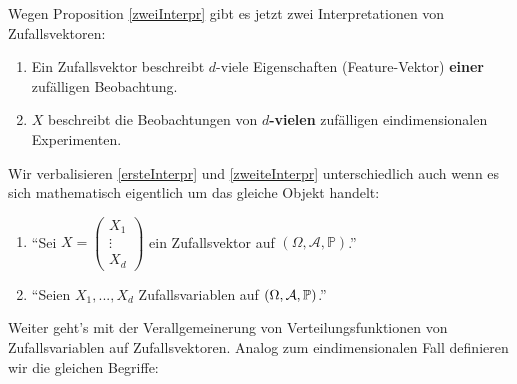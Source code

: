\begin{disc}
	Wegen Proposition \ref{zweiInterpr} gibt es jetzt zwei Interpretationen von Zufallsvektoren:
	\begin{enumerate}[label=(\roman*)]
		\item\label{ersteInterpr} Ein Zufallsvektor beschreibt $d$-viele Eigenschaften (\glqq Feature-Vektor\grqq) \textbf{einer} zuf\"alligen Beobachtung.
		\item\label{zweiteInterpr} $X$ beschreibt die Beobachtungen von \textbf{$d$-vielen} zuf\"alligen eindimensionalen Experimenten.
	\end{enumerate}
	Wir verbalisieren \ref{ersteInterpr} und \ref{zweiteInterpr} unterschiedlich auch wenn es sich mathematisch eigentlich um das gleiche Objekt handelt:
	\begin{enumerate}[label=(\roman*)]
		\item \enquote{Sei $X = \left(\begin{array}{c} X_1\\\vdots\\ X_d\end{array}\right)$ ein Zufallsvektor auf $(\Omega, \mathcal A, \mathbb P)$.}
		\item \enquote{Seien $X_1,...,X_d$ Zufallsvariablen auf $(\Omega, \mathcal{A}, \mathbb{P})$.}
	\end{enumerate}
\end{disc}
Weiter geht's mit der Verallgemeinerung von Verteilungsfunktionen von Zufallsvariablen auf Zufallsvektoren. Analog zum eindimensionalen Fall definieren wir die gleichen Begriffe:
